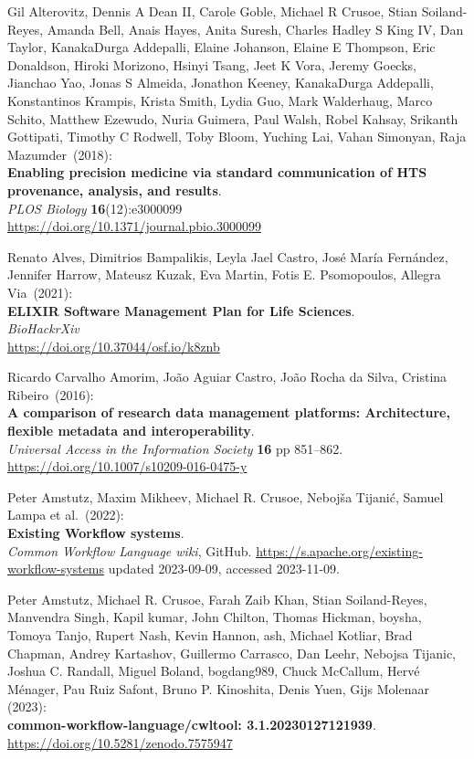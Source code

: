 \begin{thebibliography}{9}
Gil Alterovitz, Dennis A Dean II, Carole Goble, Michael R
Crusoe, Stian Soiland-Reyes, Amanda Bell, Anais Hayes, Anita Suresh,
Charles Hadley S King IV, Dan Taylor, KanakaDurga Addepalli, Elaine
Johanson, Elaine E Thompson, Eric Donaldson, Hiroki Morizono, Hsinyi
Tsang, Jeet K Vora, Jeremy Goecks, Jianchao Yao, Jonas S Almeida,
Jonathon Keeney, KanakaDurga Addepalli, Konstantinos Krampis, Krista
Smith, Lydia Guo, Mark Walderhaug, Marco Schito, Matthew Ezewudo, Nuria
Guimera, Paul Walsh, Robel Kahsay, Srikanth Gottipati, Timothy C
Rodwell, Toby Bloom, Yuching Lai, Vahan Simonyan, Raja Mazumder~(2018):\\
\textbf{Enabling precision medicine via standard communication of HTS
provenance, analysis, and results}.\\
\emph{PLOS Biology} \textbf{16}(12):e3000099\\
\url{https://doi.org/10.1371/journal.pbio.3000099}

Renato Alves, Dimitrios Bampalikis, Leyla Jael Castro,
José María Fernández, Jennifer Harrow, Mateusz Kuzak, Eva Martin, Fotis
E. Psomopoulos, Allegra Via~(2021):\\
\textbf{ELIXIR Software Management Plan for Life Sciences}.\\
\emph{BioHackrXiv}\\
\url{https://doi.org/10.37044/osf.io/k8znb}

Ricardo Carvalho Amorim, João Aguiar Castro, João Rocha da
Silva, Cristina Ribeiro~(2016):\\
\textbf{A comparison of research data management platforms:
Architecture, flexible metadata and interoperability}.\\
\emph{Universal Access in the Information Society} \textbf{16} pp
851--862.\\
\url{https://doi.org/10.1007/s10209-016-0475-y}

Peter Amstutz, Maxim Mikheev, Michael R. Crusoe, Nebojša Tijanić, Samuel Lampa et al.~(2022):\\
\textbf{Existing Workflow systems}.\\
\emph{Common Workflow Language wiki}, GitHub. 
\url{https://s.apache.org/existing-workflow-systems} updated 2023-09-09, accessed 2023-11-09.

Peter Amstutz, Michael R. Crusoe, Farah Zaib Khan, Stian Soiland-Reyes, Manvendra Singh, Kapil kumar, John Chilton, Thomas Hickman, boysha, Tomoya Tanjo, Rupert Nash, Kevin Hannon, ash, Michael Kotliar, Brad Chapman, Andrey Kartashov, Guillermo Carrasco, Dan Leehr, Nebojsa Tijanic, Joshua C. Randall, Miguel Boland, bogdang989, Chuck McCallum, Hervé Ménager, Pau Ruiz Safont, Bruno P. Kinoshita, Denis Yuen, Gijs Molenaar (2023):\\
\textbf{common-workflow-language/cwltool: 3.1.20230127121939}.\\
\url{https://doi.org/10.5281/zenodo.7575947}


\end{thebibliography}
